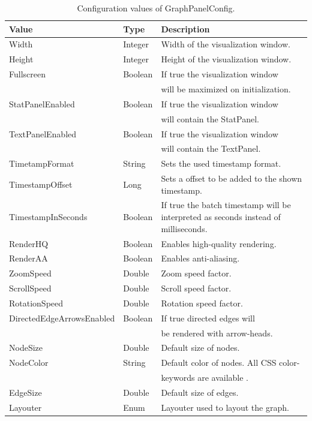 \begin{table}[h]
\caption{Configuration values of GraphPanelConfig.}
\centering
\begin{tabular}[h]{|l|l|l|}\hline
	\textbf{Value} & \textbf{Type} & \textbf{Description}\\
	\hline
	Width & Integer & Width of the visualization window.\\
	\hline
	Height & Integer & Height of the visualization window.\\
	\hline
	Fullscreen & Boolean & If true the visualization window\\
	& & will be maximized on initialization.\\
	\hline
	StatPanelEnabled & Boolean & If true the visualization window\\
	& & will contain the StatPanel.\\
	\hline
	TextPanelEnabled & Boolean & If true the visualization window\\
	& & will contain the TextPanel.\\
	\hline
	TimetampFormat & String & Sets the used timestamp format.\\
	\hline
	TimestampOffset & Long & Sets a offset to be added to the shown timestamp.\\
	\hline
	TimestampInSeconds & Boolean & If true the batch timestamp will be interpreted as seconds instead of milliseconds.\\
	\hline
	RenderHQ & Boolean & Enables high-quality rendering.\\
	\hline
	RenderAA & Boolean & Enables anti-aliasing.\\
	\hline
	ZoomSpeed & Double & Zoom speed factor.\\
	\hline
	ScrollSpeed & Double & Scroll speed factor.\\
	\hline
	RotationSpeed & Double & Rotation speed factor.\\
	\hline
	DirectedEdgeArrowsEnabled & Boolean & If true directed edges will\\
	& & be rendered with arrow-heads.\\
	\hline
	NodeSize & Double & Default size of nodes.\\
	\hline
	NodeColor & String & Default color of nodes. All CSS color-\\
	& & keywords are available \cite{css-colors}.\\
	\hline
	EdgeSize & Double & Default size of edges.\\
	\hline
	Layouter & Enum & Layouter used to layout the graph.\\

\end{tabular}
\end{table}
